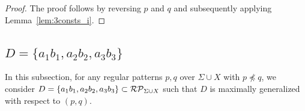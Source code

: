 \begin{proof}
%
%
The proof follows by reversing $p$ and $q$ and subsequently applying Lemma~\ref{lem:3consts_i}.
\end{proof}

\subsection{$D = \{ a_{1}b_{1}, a_{2}b_{2}, a_{3}b_{3}\}$}\label{subsec:d3c}

{\color{red}In this subsection, for any regular patterns $p,q$ over $\Sigma\cup X$ with $p\not\preceq q$, 
we consider $D = \{ a_{1}b_{1}, a_{2}b_{2}, a_{3}b_{3}\} \subset \mathcal{RP}_{\Sigma\cup X}$ such that $D$ is maximally generalized with respect to $(p,q)$.
}

